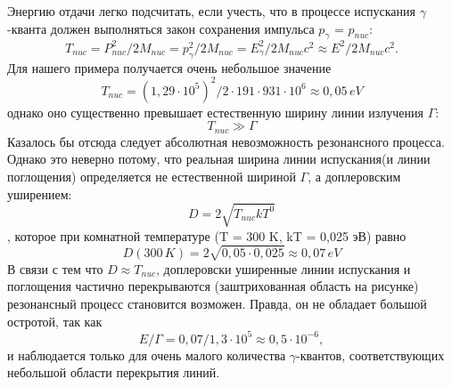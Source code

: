 \documentclass{article}
\begin{document}
\indent Энергию отдачи легко подсчитать, если учесть, что в процессе испускания $\gamma$-кванта должен выполняться закон сохранения импульса $p_{\gamma}$ = $p_{nuc}$:
$$ T_{nuc} = P_{nuc}^{2}/2M_{nuc} = p_{\gamma}^{2}/2M_{nuc} = E_{\gamma}^{2}/2M_{nuc}c^{2} \approx E^{2}/2M_{nuc}c^{2}.$$
\indent Для нашего примера получается очень небольшое значение
$$ T_{nuc} = (1,29\cdot 10^{5})^2/2\cdot 191 \cdot 931 \cdot 10^{6} \approx 0,05 \hspace{2pt}eV$$
однако оно существенно превышает естественную ширину линии излучения $\Gamma$:
$$ T_{nuc} \gg \Gamma $$
\indent Казалось бы отсюда следует абсолютная невозможность резонансного процесса. Однако это неверно потому, что реальная ширина линии испускания(и линии поглощения) определяется не естественной шириной $\Gamma$, а доплеровским уширением:
$$ D = 2\sqrt{T_{nuc}kT^0}$$,
которое при комнатной температуре (T = 300 K, kT = 0,025 эВ) равно
$$ D(300 \hspace{2pt}K) = 2\sqrt{0,05\cdot 0,025} \approx 0,07 \hspace{2pt} eV$$
\indent В связи с тем что $D \approx T_{nuc}$, доплеровски уширенные линии испускания и поглощения частично перекрываются (заштрихованная область на рисунке)  резонансный процесс становится возможен. Правда, он не обладает большой остротой, так как
$$ E/\Gamma = 0,07/1,3 \cdot 10^{5} \approx 0,5 \cdot 10^{-6},$$
и наблюдается только для очень малого количества $\gamma$-квантов, соответствующих небольшой области перекрытия линий.
\end{document}

